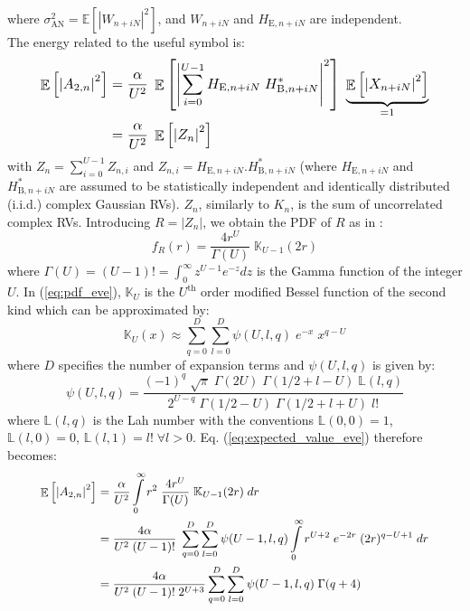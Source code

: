 \documentclass[a4paper,11pt]{article}
\begin{document}
where $\sigma^2_{\text{AN}} = \mathbb{E}\left[\left| W_{n+iN} \right|^2 \right]$, and $W_{n+iN}$ and $H_{\text{E}, n + iN}$ are independent.\\
The energy related to the useful symbol is:
\begin{equation}
\resizebox{0.89\hsize}{!}{$
    \begin{split}
         \mathop{\mathbb{E}}\left[ \left| A_{2,n} \right|^2 \right]
         &= \frac{\alpha}{U^2}\; \mathop{\mathbb{E}}\left[ \left| \sum_{i=0}^{U-1}  H_{\text{E},n+iN} \; H^*_{\text{B},n+iN} \right|^2 \right] \; \underbrace{\mathop{\mathbb{E}}\left[ \left| X_{n+iN}\right|^2 \right]}_{=1} \\
         &= \frac{\alpha}{U^2} \; \mathop{\mathbb{E}}\left[ \left| Z_n \right|^2 \right]
    \end{split}$}
    \label{eq:expected_value_eve}
\end{equation}
with $Z_n = \sum_{i=0}^{U-1} Z_{n,i}$ and $Z_{n,i} = H_{\text{E},n+iN}.H_{\text{B},n+iN}^*$ (where $H_{\text{E},n+iN}$ and $H_{\text{B},n+iN}^*$ are assumed to be statistically independent and identically distributed (i.i.d.) complex Gaussian RVs). $Z_n$, similarly to $K_n$, is  the sum of uncorrelated complex RVs. Introducing $R = | Z_n |$, we obtain the PDF of $R$ as in \cite{TR_FD_TD}:
\begin{equation}
    f_R(r) = \frac{4r^U}{\Gamma(U)} \; \mathbb{K}_{U-1}\left( 2r\right)
    \label{eq:pdf_eve}
\end{equation}
where $\Gamma(U) = (U-1)! = \int_0^\infty z^{U-1} e^{-z} dz$ is the Gamma function of the integer $U$. In (\ref{eq:pdf_eve}), $\mathbb{K}_{U}$ is the $U^{\text{th}}$ order modified Bessel function of the second kind which can be approximated by:
\begin{equation}
    \mathbb{K}_{U}(x) \approx \sum_{q=0}^{D}\sum_{l=0}^{D} \psi(U,l,q) \; e^{-x} \; x^{q-U}
\end{equation}
where $D$ specifies the number of expansion terms and $\psi(U,l,q)$ is given by:
\begin{equation}
    \psi(U,l,q) = \frac{(-1)^q \; \sqrt{\pi} \; \Gamma(2U) \; \Gamma(1/2+l-U) \; \mathbb{L}(l,q)}{2^{U-q}\; \Gamma(1/2-U) \; \Gamma(1/2+l+U) \; l!}
\end{equation}
where $\mathbb{L}(l,q)$ is the Lah number \cite{TR_la} with the conventions $\mathbb{L}(0,0) = 1$,  $\mathbb{L}(l,0) = 0$,  $\mathbb{L}(l,1) = l! \; \forall l > 0$. Eq. (\ref{eq:expected_value_eve}) therefore becomes: 
\begin{equation}
\resizebox{0.89\hsize}{!}{$
    \begin{split}
        \mathop{\mathbb{E}}\left[ \left| A_{2,n} \right|^2 \right] &= \frac{\alpha}{U^2} \int\limits_{0}^{\infty} r^2 \;\frac{ 4r^U}{\Gamma(U)}\; \mathbb{K}_{U-1}(2r) \; dr \\
        &= \frac{4\alpha}{U^2 \; (U-1)!} \; \sum_{q=0}^{D}\sum_{l=0}^{D} \psi(U-1,l,q) \int\limits_{0}^{\infty} r^{U+2} \; e^{-2r}  \;  (2r)^{q-U+1} \; dr \\
        &=  \frac{4\alpha}{U^2 \; (U-1)!\; 2^{U+3}} \sum_{q=0}^{D}\sum_{l=0}^{D} \psi(U-1,l,q) \; \Gamma(q+4) 
    \end{split}$}
\end{equation}
\end{document}
